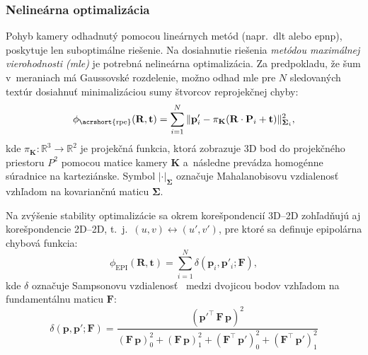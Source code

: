     \subsubsection{Nelineárna optimalizácia}

      Pohyb kamery odhadnutý pomocou lineárnych metód (napr.\ \acrshort{dlt} alebo \acrshort{epnp}), poskytuje len suboptimálne riešenie. Na dosiahnutie riešenia \emph{metódou maximálnej vierohodnosti (\acrshort{mle})} je potrebná nelineárna optimalizácia. Za predpokladu, že šum v~meraniach má Gaussovské rozdelenie, možno odhad \acrshort{mle} pre $N$ sledovaných textúr dosiahnuť minimalizáciou sumy štvorcov reprojekčnej chyby:
      \begin{equation}
      \phi_{\mathrm{\acrshort{rpe}}}(\mathbf{R}, \mathbf{t}) = \sum_{i=1}^{N} \| \mathbf{p}'_i - \pi_{\mathbf{K}}(\mathbf{R} \cdot \mathbf{P}_i + \mathbf{t}) \Vert^2_{\boldsymbol{\Sigma}_i},
      \label{eq:rpe}
      \end{equation}
      kde $\pi_{\mathbf{K}} : \mathbb{R}^3 \rightarrow \mathbb{R}^2$ je projekčná funkcia, ktorá zobrazuje 3D bod do projekčného priestoru $P^2$ pomocou matice kamery $\mathbf{K}$ a~následne prevádza homogénne súradnice na karteziánske. Symbol $|\cdot|_{\boldsymbol{\Sigma}}$ označuje Mahalanobisovu vzdialenosť vzhľadom na kovariančnú maticu $\boldsymbol{\Sigma}$.

      Na zvýšenie stability optimalizácie sa okrem korešpondencií 3D--2D zohľadňujú aj korešpondencie 2D--2D, t.\ j.\ $(u, v) \leftrightarrow (u', v')$, pre ktoré sa definuje epipolárna chybová funkcia:
      \begin{equation}
      \phi_{\text{EPI}}(\mathbf{R}, \mathbf{t}) = \sum_{i=1}^{N} \delta(\mathbf{p}_i, \mathbf{p}'_i; \mathbf{F}),
      \label{eq:epi}
      \end{equation}
      kde $\delta$ označuje Sampsonovu vzdialenosť~\cite{sampsonFittingConicSections1982} medzi dvojicou bodov vzhľadom na fundamentálnu maticu $\mathbf{F}$:
      \begin{equation}
      \delta(\mathbf{p}, \mathbf{p}'; \mathbf{F}) =
      \frac{{(\mathbf{p}'^\top\, \mathbf{F}\, \mathbf{p})}^2}
      {{(\mathbf{F}\, \mathbf{p})}_0^2 + {(\mathbf{F}\, \mathbf{p})}_1^2 + {(\mathbf{F}^\top\, \mathbf{p}')}_0^2 + {(\mathbf{F}^\top\, \mathbf{p}')}_1^2}
      \label{eq:sampson}
      \end{equation}

